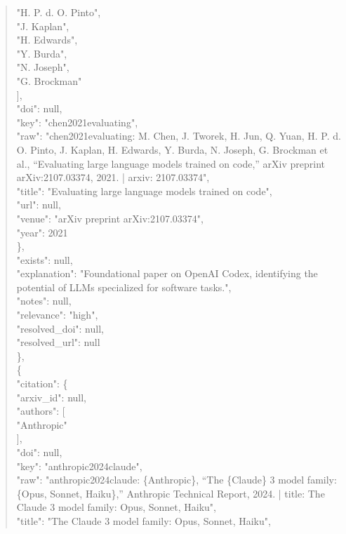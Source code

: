 \documentclass[11pt]{article}
\begin{document}
\begin{quote}
          "H. P. d. O. Pinto",\\
          "J. Kaplan",\\
          "H. Edwards",\\
          "Y. Burda",\\
          "N. Joseph",\\
          "G. Brockman"\\
        ],\\
        "doi": null,\\
        "key": "chen2021evaluating",\\
        "raw": "chen2021evaluating: M. Chen, J. Tworek, H. Jun, Q. Yuan, H. P. d. O. Pinto, J. Kaplan, H. Edwards, Y. Burda, N. Joseph, G. Brockman et al., ``Evaluating large language models trained on code,'' arXiv preprint arXiv:2107.03374, 2021. | arxiv: 2107.03374",\\
        "title": "Evaluating large language models trained on code",\\
        "url": null,\\
        "venue": "arXiv preprint arXiv:2107.03374",\\
        "year": 2021\\
      \},\\
      "exists": null,\\
      "explanation": "Foundational paper on OpenAI Codex, identifying the potential of LLMs specialized for software tasks.",\\
      "notes": null,\\
      "relevance": "high",\\
      "resolved\_doi": null,\\
      "resolved\_url": null\\
    \},\\
    \{\\
      "citation": \{\\
        "arxiv\_id": null,\\
        "authors": [\\
          "Anthropic"\\
        ],\\
        "doi": null,\\
        "key": "anthropic2024claude",\\
        "raw": "anthropic2024claude: \{Anthropic\}, ``The \{Claude\} 3 model family: \{Opus, Sonnet, Haiku\},'' Anthropic Technical Report, 2024. | title: The Claude 3 model family: Opus, Sonnet, Haiku",\\
        "title": "The Claude 3 model family: Opus, Sonnet, Haiku",\\

\end{quote}
\end{document}
